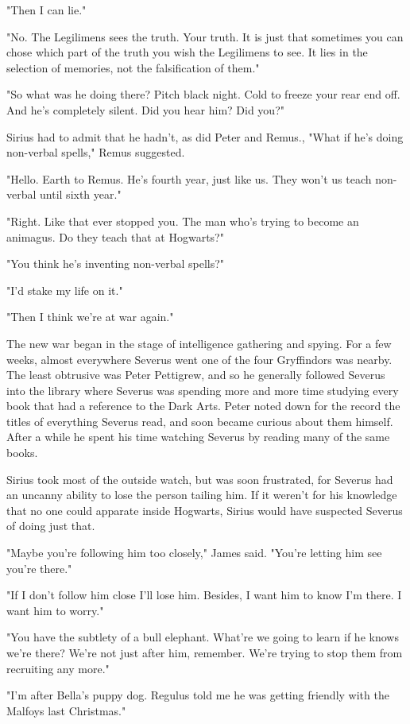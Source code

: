 "Then I can lie."

"No. The Legilimens sees the truth. Your truth. It is just that sometimes you can chose which part of the truth you wish the Legilimens to see. It lies in the selection of memories, not the falsification of them."

"So what was he doing there? Pitch black night. Cold to freeze your{\el} rear end off. And he's completely silent. Did you hear him? Did you?"

Sirius had to admit that he hadn't, as did Peter and Remus., "What if he's doing non-verbal spells," Remus suggested.

"Hello. Earth to Remus. He's fourth year, just like us. They won't us teach non-verbal until sixth year."

"Right. Like that ever stopped you. The man who's trying to become an animagus. Do they teach that at Hogwarts?"

"You think he's inventing non-verbal spells?"

"I'd stake my life on it."

"Then I think we're at war again."

The new war began in the stage of intelligence gathering and spying. For a few weeks, almost everywhere Severus went one of the four Gryffindors was nearby. The least obtrusive was Peter Pettigrew, and so he generally followed Severus into the library where Severus was spending more and more time studying every book that had a reference to the Dark Arts. Peter noted down for the record the titles of everything Severus read, and soon became curious about them himself. After a while he spent his time watching Severus by reading many of the same books.

Sirius took most of the outside watch, but was soon frustrated, for Severus had an uncanny ability to lose the person tailing him. If it weren't for his knowledge that no one could apparate inside Hogwarts, Sirius would have suspected Severus of doing just that.

"Maybe you're following him too closely," James said. "You're letting him see you're there."

"If I don't follow him close I'll lose him. Besides, I want him to know I'm there. I want him to worry."

"You have the subtlety of a bull elephant. What're we going to learn if he knows we're there? We're not just after him, remember. We're trying to stop them from recruiting any more."

"I'm after Bella's puppy dog. Regulus told me he was getting friendly with the Malfoys last Christmas."

